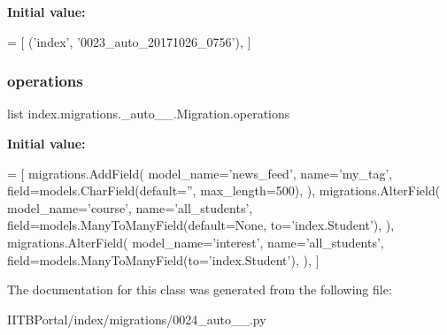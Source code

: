 {\bfseries Initial value\+:}
\begin{DoxyCode}
=  [
        (\textcolor{stringliteral}{'index'}, \textcolor{stringliteral}{'0023\_auto\_20171026\_0756'}),
    ]
\end{DoxyCode}
\mbox{\label{classindex_1_1migrations_1_10024__auto__20171026__0759_1_1Migration_aeb49a960fec773fde24cd983a8338923}} 
\subsubsection{\texorpdfstring{operations}{operations}}
{\footnotesize\ttfamily list index.\+migrations.\+\_\+auto\+\_\+\_.\+Migration.\+operations\hspace{0.3cm}{\ttfamily [static]}}

{\bfseries Initial value\+:}
\begin{DoxyCode}
=  [
        migrations.AddField(
            model\_name=\textcolor{stringliteral}{'news\_feed'},
            name=\textcolor{stringliteral}{'my\_tag'},
            field=models.CharField(default=\textcolor{stringliteral}{''}, max\_length=500),
        ),
        migrations.AlterField(
            model\_name=\textcolor{stringliteral}{'course'},
            name=\textcolor{stringliteral}{'all\_students'},
            field=models.ManyToManyField(default=\textcolor{keywordtype}{None}, to=\textcolor{stringliteral}{'index.Student'}),
        ),
        migrations.AlterField(
            model\_name=\textcolor{stringliteral}{'interest'},
            name=\textcolor{stringliteral}{'all\_students'},
            field=models.ManyToManyField(to=\textcolor{stringliteral}{'index.Student'}),
        ),
    ]
\end{DoxyCode}


The documentation for this class was generated from the following file\+:\begin{DoxyCompactItemize}
\item 
I\+I\+T\+B\+Portal/index/migrations/0024\+\_\+auto\+\_\+\_.\+py\end{DoxyCompactItemize}
